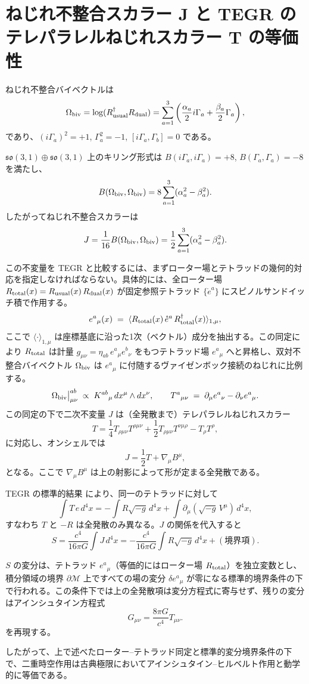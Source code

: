 \documentclass[a4paper]{article}
\begin{document}
\section{ねじれ不整合スカラー J と TEGR のテレパラレルねじれスカラー T の等価性}
\label{app:TEGR-equivalence}

ねじれ不整合バイベクトルは
\[
\Omega_{\rm biv} = \log(R_{\rm usual}^\dagger R_{\rm dual}) = \sum_{a=1}^3 \left( \frac{\alpha_a}{2} i\Gamma_a + \frac{\beta_a}{2} \Gamma_a \right),
\]
であり、\( (i\Gamma_a)^2 = +1 \), \( \Gamma_a^2 = -1 \), \([i\Gamma_a, \Gamma_b] = 0\) である。

\(\mathfrak{so}(3,1) \oplus \mathfrak{so}(3,1)\) 上のキリング形式は \( B(i\Gamma_a, i\Gamma_a) = +8 \), \( B(\Gamma_a, \Gamma_a) = -8 \) を満たし、
\[
B(\Omega_{\rm biv}, \Omega_{\rm biv}) = 8 \sum_{a=1}^3 (\alpha_a^2 - \beta_a^2).
\]
したがってねじれ不整合スカラーは
\[
J = \frac{1}{16} B(\Omega_{\rm biv}, \Omega_{\rm biv}) = \frac12 \sum_{a=1}^3 (\alpha_a^2 - \beta_a^2).
\]

この不変量を TEGR と比較するには、まずローター場とテトラッドの幾何的対応を指定しなければならない。具体的には、全ローター場 $R_{\rm total}(x) = R_{\rm usual}(x)\, R_{\rm dual}(x)$ が固定参照テトラッド $\{\mathring{e}^a\}$ にスピノルサンドイッチ積で作用する。
\[
e^a{}_\mu(x) \;=\; \langle R_{\rm total}(x)\, \mathring{e}^a\, R_{\rm total}^\dagger(x) \rangle_{1,\mu},
\]
ここで $\langle \cdot \rangle_{1,\mu}$ は座標基底に沿った1次（ベクトル）成分を抽出する。この同定により $R_{\rm total}$ は計量 $g_{\mu\nu} = \eta_{ab}\, e^a{}_\mu e^b{}_\nu$ をもつテトラッド場 $e^a{}_\mu$ へと昇格し、双対不整合バイベクトル $\Omega_{\rm biv}$ は $e^a{}_\mu$ に付随するヴァイゼンボック接続のねじれに比例する。
\[
\Omega_{\rm biv}\big|_{\mu\nu}^{ab} \;\propto\; K^{ab}{}_\mu\, dx^\mu \wedge dx^\nu,
\qquad
T^a{}_{\mu\nu} \;=\; \partial_\mu e^a{}_\nu - \partial_\nu e^a{}_\mu.
\]
この同定の下で二次不変量 $J$ は（全発散まで）テレパラレルねじれスカラー
\[
T = \frac14 T_{\rho\mu\nu}T^{\rho\mu\nu} + \frac12 T_{\rho\mu\nu}T^{\nu\mu\rho} - T_\rho T^\rho,
\]
に対応し、オンシェルでは
\[
J = \frac12 T + \nabla_\mu B^\mu,
\]
となる。ここで $\nabla_\mu B^\mu$ は上の射影によって形が定まる全発散である。

TEGR の標準的結果 \cite{maluf2013} により、同一のテトラッドに対して
\[
\int T\, e\, d^4x = -\int R\sqrt{-g}\, d^4x + \int \partial_\mu(\sqrt{-g}\, V^\mu)\, d^4x,
\]
すなわち $T$ と $-R$ は全発散のみ異なる。$J$ の関係を代入すると
\[
S = \frac{c^4}{16\pi G} \int J \, d^4x = -\frac{c^4}{16\pi G} \int R \sqrt{-g}\, d^4x + (\text{境界項}).
\]

$S$ の変分は、テトラッド $e^a{}_\mu$（等価的にはローター場 $R_{\rm total}$）を独立変数とし、積分領域の境界 $\partial\mathcal{M}$ 上ですべての場の変分 $\delta e^a{}_\mu$ が零になる標準的境界条件の下で行われる。この条件下では上の全発散項は変分方程式に寄与せず、残りの変分はアインシュタイン方程式
\[
G_{\mu\nu} = \frac{8\pi G}{c^4} T_{\mu\nu}.
\]
を再現する。

したがって、上で述べたローター--テトラッド同定と標準的変分境界条件の下で、二重時空作用は古典極限においてアインシュタイン--ヒルベルト作用と動学的に等価である。
\end{document}
